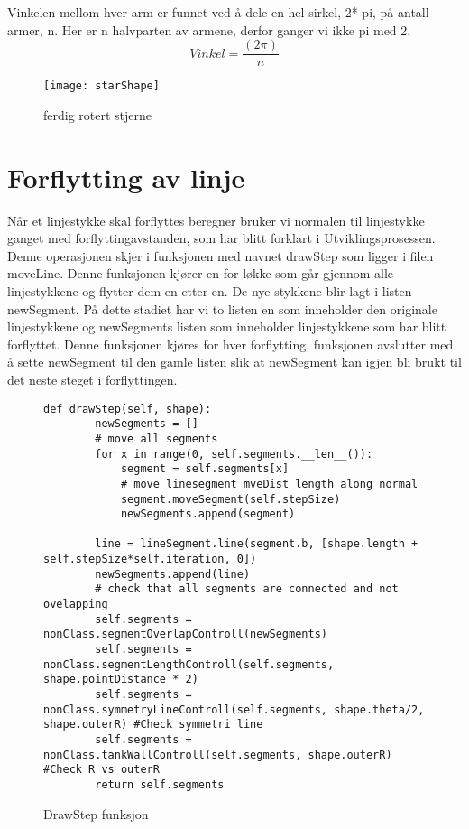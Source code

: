 Vinkelen mellom hver arm er funnet ved å dele en hel sirkel, 2* pi, på antall armer,  n.  Her er n halvparten av armene, derfor ganger vi ikke pi med 2.
\begin{equation}
Vinkel = \frac{(2\pi)}{n}
\end{equation}

\begin{figure}[H]
    \centering
    \texttt{[image: starShape]}
    \caption{ferdig rotert stjerne}
    \label{fig:my_label}
\end{figure}


\section{Forflytting av linje}
Når et linjestykke skal forflyttes beregner bruker vi normalen til linjestykke ganget med forflyttingavstanden, som har blitt forklart i Utviklingsprosessen. Denne operasjonen skjer i funksjonen med navnet drawStep som ligger i filen moveLine. Denne funksjonen kjører en for løkke som går gjennom alle linjestykkene og flytter dem en etter en. De nye stykkene blir lagt i listen newSegment. På dette stadiet har vi to listen en som inneholder den originale linjestykkene og newSegments listen som inneholder linjestykkene som har blitt forflyttet. Denne funksjonen kjøres for hver forflytting, funksjonen avslutter med å sette newSegment til den gamle listen slik at newSegment kan igjen bli brukt til det neste steget i forflyttingen.
\clearpage
\begin{figure}
\lstset{language=Python, breaklines=true,} 
\begin{lstlisting}[frame=single]  
    def drawStep(self, shape):
        newSegments = []
        # move all segments
        for x in range(0, self.segments.__len__()):
            segment = self.segments[x]
            # move linesegment mveDist length along normal
            segment.moveSegment(self.stepSize)
            newSegments.append(segment)
        
        line = lineSegment.line(segment.b, [shape.length + self.stepSize*self.iteration, 0])
        newSegments.append(line)
        # check that all segments are connected and not ovelapping
        self.segments = nonClass.segmentOverlapControll(newSegments)
        self.segments = nonClass.segmentLengthControll(self.segments, shape.pointDistance * 2)
        self.segments = nonClass.symmetryLineControll(self.segments, shape.theta/2, shape.outerR) #Check symmetri line
        self.segments = nonClass.tankWallControll(self.segments, shape.outerR) #Check R vs outerR
        return self.segments

\end{lstlisting}
    \caption{DrawStep funksjon}
        \label{fig:my_label}
\end{figure}
